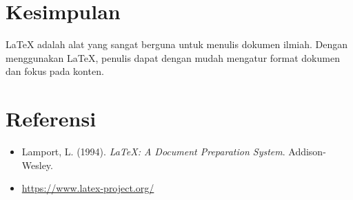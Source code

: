 \documentclass[a4paper,12pt]{report}
\begin{document}
\section{Kesimpulan}
LaTeX adalah alat yang sangat berguna untuk menulis dokumen ilmiah. Dengan menggunakan LaTeX, penulis dapat dengan mudah mengatur format dokumen dan fokus pada konten.

\section*{Referensi}
\begin{itemize}
    \item Lamport, L. (1994). \textit{LaTeX: A Document Preparation System}. Addison-Wesley.
    \item \url{https://www.latex-project.org/}
\end{itemize}
\end{document}
